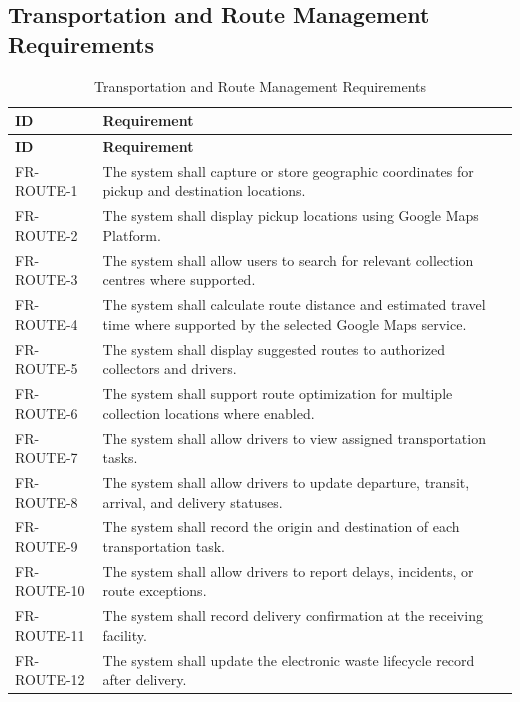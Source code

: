 \subsection{Transportation and Route Management Requirements}
\begin{longtable}{@{}p{2.4cm}p{11cm}@{}}
\caption{Transportation and Route Management Requirements} \label{tab:fr-route} \\
\toprule \textbf{ID} & \textbf{Requirement} \\ \midrule
\endfirsthead
\toprule \textbf{ID} & \textbf{Requirement} \\ \midrule
\endhead
FR-ROUTE-1 & The system shall capture or store geographic coordinates for pickup and destination locations. \\
FR-ROUTE-2 & The system shall display pickup locations using Google Maps Platform. \\
FR-ROUTE-3 & The system shall allow users to search for relevant collection centres where supported. \\
FR-ROUTE-4 & The system shall calculate route distance and estimated travel time where supported by the selected Google Maps service. \\
FR-ROUTE-5 & The system shall display suggested routes to authorized collectors and drivers. \\
FR-ROUTE-6 & The system shall support route optimization for multiple collection locations where enabled. \\
FR-ROUTE-7 & The system shall allow drivers to view assigned transportation tasks. \\
FR-ROUTE-8 & The system shall allow drivers to update departure, transit, arrival, and delivery statuses. \\
FR-ROUTE-9 & The system shall record the origin and destination of each transportation task. \\
FR-ROUTE-10 & The system shall allow drivers to report delays, incidents, or route exceptions. \\
FR-ROUTE-11 & The system shall record delivery confirmation at the receiving facility. \\
FR-ROUTE-12 & The system shall update the electronic waste lifecycle record after delivery. \\
\bottomrule
\end{longtable}

